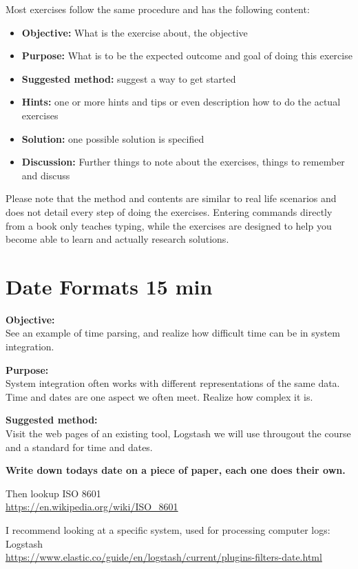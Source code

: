\documentclass[a4paper,11pt,notitlepage]{report}
\begin{document}
Most exercises follow the same procedure and has the following content:
\begin{itemize}
\item {\bf Objective:} What is the exercise about, the objective
\item {\bf Purpose:} What is to be the expected outcome and goal of doing this exercise
\item {\bf Suggested method:} suggest a way to get started
\item {\bf Hints:} one or more hints and tips or even description how to
do the actual exercises
\item {\bf Solution:} one possible solution is specified
\item {\bf Discussion:} Further things to note about the exercises, things to remember and discuss
\end{itemize}

Please note that the method and contents are similar to real life scenarios and does not detail every step of doing the exercises. Entering commands directly from a book only teaches typing, while the exercises are designed to help you become able to learn and actually research solutions.


\chapter{Date Formats 15 min}
\label{ex:sys-int-dateformats}


{\bf Objective:}\\
See an example of time parsing, and realize how difficult time can be in system integration.

{\bf Purpose:}\\
System integration often works with different representations of the same data. Time and dates are one aspect we often meet. Realize how complex it is.

{\bf Suggested method:}\\
Visit the web pages of an existing tool, Logstash we will use througout the course and a standard for time and dates.

{\bf Write down todays date on a piece of paper, each one does their own.}

Then lookup ISO 8601\\
\url{https://en.wikipedia.org/wiki/ISO_8601}

I recommend looking at a specific system, used for processing computer logs:
Logstash \\
\url{https://www.elastic.co/guide/en/logstash/current/plugins-filters-date.html}
\end{document}
